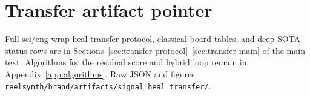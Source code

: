 
\section{Transfer artifact pointer}
\label{app:transfer-pilot}

Full sci/eng wrap-heal transfer protocol, classical-board tables, and deep-SOTA status rows are in
Sections~\ref{sec:transfer-protocol}--\ref{sec:transfer-main} of the main text.
Algorithms for the residual score and hybrid loop remain in Appendix~\ref{app:algorithms}.
Raw JSON and figures: \texttt{reelsynth/brand/artifacts/signal\_heal\_transfer/}.
